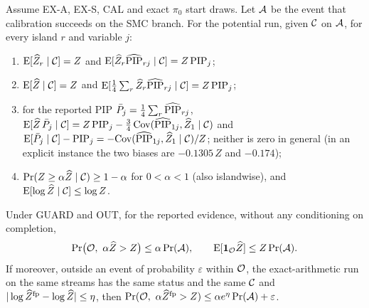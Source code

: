 \begin{proposition}\label{prop:frozen}
Assume EX-A, EX-S, CAL and exact $\pi_0$ start draws. Let $\mathcal A$ be the event that calibration succeeds on the SMC
branch. For the potential run, given $\mathcal C$ on $\mathcal A$, for every island $r$ and variable $j$:
\begin{enumerate}
\item[(a)] $\mathrm E[\widehat Z_r\mid\mathcal C]=Z$ and $\mathrm E[\widehat Z_r\widehat{\mathrm{PIP}}_{rj}\mid\mathcal C]=Z\,\mathrm{PIP}_j$;
\item[(b)] $\mathrm E[\widehat Z\mid\mathcal C]=Z$ and $\mathrm E[\tfrac14\sum_r\widehat Z_r\widehat{\mathrm{PIP}}_{rj}\mid\mathcal C]=Z\,\mathrm{PIP}_j$;
\item[(c)] for the reported PIP $\bar P_j=\tfrac14\sum_r\widehat{\mathrm{PIP}}_{rj}$,
  $\mathrm E[\widehat Z\,\bar P_j\mid\mathcal C]=Z\,\mathrm{PIP}_j-\tfrac34\,\mathrm{Cov}(\widehat{\mathrm{PIP}}_{1j},\widehat Z_1\mid\mathcal C)$ and
  $\mathrm E[\bar P_j\mid\mathcal C]-\mathrm{PIP}_j=-\mathrm{Cov}(\widehat{\mathrm{PIP}}_{1j},\widehat Z_1\mid\mathcal C)/Z$; neither is zero in general
  (in an explicit instance the two biases are $-0.1305\,Z$ and $-0.174$);
\item[(d)] $\Pr(Z\ge\alpha\widehat Z\mid\mathcal C)\ge1-\alpha$ for $0<\alpha<1$ (also islandwise), and $\mathrm E[\log\widehat Z\mid\mathcal C]\le\log Z$.
\end{enumerate}
Under GUARD and OUT, for the reported evidence, without any conditioning on completion,
\[
\Pr\bigl(\cO,\ \alpha\Zh>Z\bigr)\le\alpha\Pr(\cA),\qquad \mathrm E[\mathbf 1_{\cO}\Zh]\le Z\Pr(\cA).
\]
If moreover, outside an event of probability $\varepsilon$ within $\mathcal O$, the exact-arithmetic run on the same streams has
the same status and the same $\mathcal C$ and $|\log\widehat Z^{\rm fp}-\log\widehat Z|\le\eta$, then
$\Pr(\mathcal O,\ \alpha\widehat Z^{\rm fp}>Z)\le\alpha e^{\eta}\Pr(\mathcal A)+\varepsilon$.
\end{proposition}

